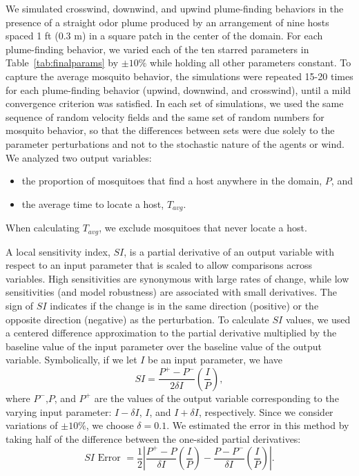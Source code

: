 \documentclass[10pt]{article}
\begin{document}
We simulated crosswind, downwind, and upwind plume-finding behaviors in the presence of a straight odor plume produced by an arrangement of nine hosts spaced 1 ft (0.3 m) in a  square patch in the center of the domain. For each plume-finding behavior, we varied each of the ten starred parameters in Table~\ref{tab:finalparams} by $\pm 10\%$ while holding all other parameters constant. To capture the average mosquito behavior, the simulations were repeated 15-20 times for each plume-finding behavior (upwind, downwind, and crosswind), until a mild convergence criterion was satisfied. In each set of simulations, we used the same sequence of random velocity fields and the same set of random numbers for mosquito behavior, so that the differences between sets were due solely to the parameter perturbations and not to the stochastic nature of the agents or wind.
%
We analyzed two output variables:
\begin{itemize}
\item the proportion of mosquitoes that find a host anywhere in the domain, $P$, and
\item the average time to locate a host, $T_{avg}$.
\end{itemize}
When calculating $T_{avg}$, we exclude mosquitoes that never locate a host.

A local sensitivity index, $SI$, is a partial derivative of an output variable with respect to an input parameter that is scaled to allow comparisons across variables. High sensitivities are synonymous with large rates of change, while low sensitivities (and model robustness) are associated with small derivatives. The sign of $SI$ indicates if the change is in the same direction (positive) or the opposite direction (negative) as the perturbation. To calculate $SI$ values, we used a centered difference approximation to the partial derivative multiplied by the baseline value of the input parameter over the baseline value of the output variable. Symbolically, if we let $I$ be an input parameter, we have
\begin{equation}
	SI = \frac{P^+ - P^-}{2\delta I}\left(\frac{I}{P}\right), \label{eqn:SI}
\end{equation}
where $P^-$,$P$, and $P^+$ are the values of the output variable corresponding to the varying input parameter: $I - \delta I$, $I$, and $I + \delta I$, respectively. Since we consider variations of $\pm 10\%$, we choose $\delta = 0.1$.
We estimated the error in this method by taking half of the difference between the one-sided partial derivatives:
\begin{equation}
	SI \text{ Error } = \frac{1}{2}\left|\frac{P^+ - P}{\delta I}\left(\frac{I}{P}\right) - \frac{P - P^-}{\delta I}\left(\frac{I}{P}\right) \right|. \label{eqn:SIerr}
\end{equation}
\end{document}
